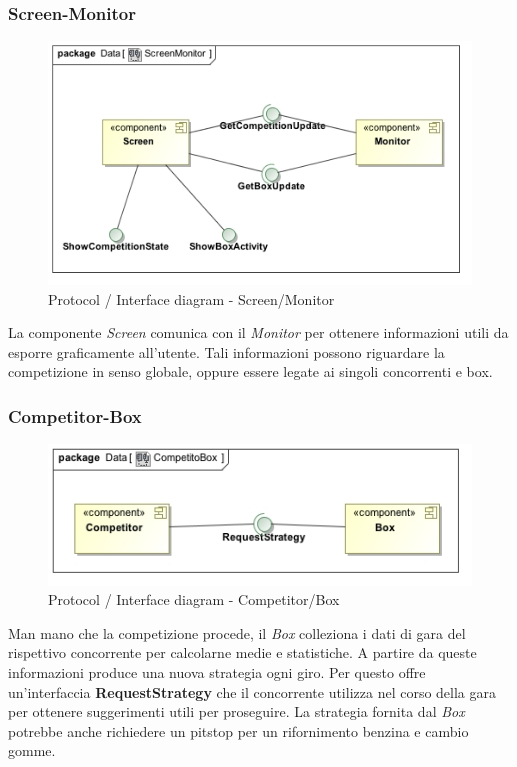 \subsubsection{Screen-Monitor}
\begin{center}
\begin{figure}[h!]
	\includegraphics[scale=0.55]{img/InteractionDiagram/Implementation_Diagram__ScreenMonitor.jpg}
\caption{Protocol / Interface diagram - Screen/Monitor}
\end{figure}
\end{center}
La componente \emph{Screen} comunica con il \emph{Monitor} per ottenere informazioni utili da esporre graficamente all'utente. Tali
informazioni possono riguardare la competizione in senso globale, oppure essere legate ai singoli concorrenti e box.
\subsubsection{Competitor-Box}
\begin{center}
\begin{figure}[h!]
	\includegraphics[scale=0.55]{img/InteractionDiagram/Implementation_Diagram__CompetitoBox.jpg}
\caption{Protocol / Interface diagram - Competitor/Box}
\end{figure}
\end{center}
Man mano che la competizione procede, il \emph{Box} colleziona i dati di gara del rispettivo concorrente per calcolarne medie e statistiche. 
A partire da queste informazioni produce una nuova strategia ogni giro. Per questo offre un'interfaccia \textbf{RequestStrategy} che il concorrente
utilizza nel corso della gara per ottenere suggerimenti utili per proseguire. La strategia fornita dal \emph{Box} potrebbe anche richiedere 
un pitstop per un rifornimento benzina e cambio gomme.
